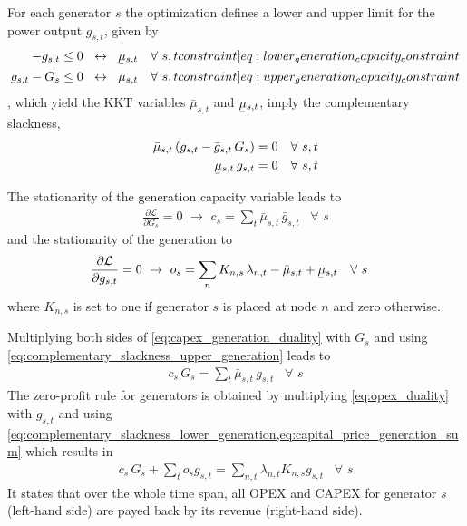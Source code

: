 \documentclass[11pt,twocolumn]{article}
\newcommand{\ubar}[1]{\underaccent{\bar}{#1}}
\newcommand{\resultsin}[1]{\hspace{6pt} \leftrightarrow  \hspace{6pt} #1}
\newcommand{\Forall}[1]{\hspace{10pt} \forall \,\, #1 }
\newcommand{\pdv}[2]{\frac{\partial #1}{\partial #2}}
\newcommand{\generation}{g_{s,t}}
\newcommand{\generationpotential}{\bar{g}_{s,t}}
\newcommand{\capacitygeneration}{G_{s}}
\newcommand{\operationalpricegeneration}{o_{s}}
\newcommand{\capitalpricegeneration}{c_{s}}
\newcommand{\mulowergeneration}{\ubar{\mu}_{s,t}}
\newcommand{\muuppergeneration}{\bar{\mu}_{s,t}}
\newcommand{\lagrangian}{\mathcal{L}}
\newcommand{\lmp}[1][n]{\lambda_{#1,t}}
\newcommand{\incidencegenerator}[1][n]{K_{#1,s}}
\begin{document}
For each generator $s$ the optimization defines a lower and upper limit for the power output $\generation$, given by 
\begin{align}
    - \generation &\le 0 \resultsin{\mulowergeneration} \Forall{s,t} 
    \label[constraint]{eq:lower_generation_capacity_constraint} \\
    \generation - \capacitygeneration  &\le 0 \resultsin{\muuppergeneration} \Forall{s,t} 
    \label[constraint]{eq:upper_generation_capacity_constraint}
\end{align} 
, which yield the \ac{KKT} variables $\muuppergeneration$ and $\mulowergeneration$, imply the complementary slackness,
\begin{align}
\muuppergeneration \left( \generation - \generationpotential \, \capacitygeneration \right)  &= 0  \Forall{s,t} 
\label{eq:complementary_slackness_upper_generation} \\
\mulowergeneration  \, \generation &= 0 \Forall{s,t}
\label{eq:complementary_slackness_lower_generation} 
\end{align}


The stationarity of the generation capacity variable leads to 
\begin{align}
\pdv{\lagrangian}{\capacitygeneration}  = 0 \,\, \rightarrow \,\, 
\capitalpricegeneration =  \sum_t \muuppergeneration \, \generationpotential  \Forall{s}
\label{eq:capex_generation_duality}
\end{align}
and the stationarity of the generation to 
\begin{align}
\pdv{\lagrangian}{\generation} &= 0 \,\, \rightarrow \,\,  
\operationalpricegeneration =  \sum_n \incidencegenerator \, \lmp - \muuppergeneration + \mulowergeneration \Forall{s} \label{eq:opex_duality}
\end{align}
where $\incidencegenerator$ is set to one if generator $s$ is placed at node $n$ and zero otherwise.

Multiplying both sides of \cref{eq:capex_generation_duality} with $\capacitygeneration$ and using \cref{eq:complementary_slackness_upper_generation} leads to 
\begin{align}
 \capitalpricegeneration \, \capacitygeneration  = \sum_t \muuppergeneration \, \generation \Forall{s} 
 \label{eq:capital_price_generation_sum}
\end{align}
The zero-profit rule for generators is obtained by multiplying \cref{eq:opex_duality} with $\generation$ and using \cref{eq:complementary_slackness_lower_generation,eq:capital_price_generation_sum} which results in 
\begin{align}
  \capitalpricegeneration \, \capacitygeneration + \sum_t \operationalpricegeneration \generation = \sum_{n,t} \lmp \incidencegenerator \generation \Forall{s}
\end{align}
It states that over the whole time span, all \ac{OPEX} and \ac{CAPEX} for generator $s$ (left-hand side) are payed back by its revenue (right-hand side).
\end{document}
